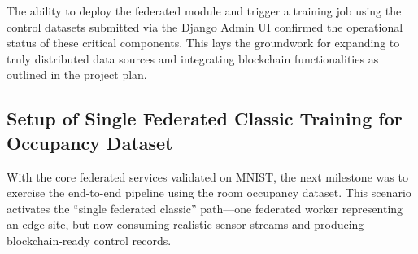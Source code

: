 The ability to deploy the federated module and trigger a training job using the control datasets submitted via the Django Admin UI confirmed the operational status of these critical components. This lays the groundwork for expanding to truly distributed data sources and integrating blockchain functionalities as outlined in the project plan.

\subsection{Setup of Single Federated Classic Training for Occupancy Dataset}
\label{subsec:single_fed_classic_occupancy}

With the core federated services validated on MNIST, the next milestone was to exercise the end-to-end pipeline using the room occupancy dataset. This scenario activates the ``single federated classic'' path—one federated worker representing an edge site, but now consuming realistic sensor streams and producing blockchain-ready control records.

